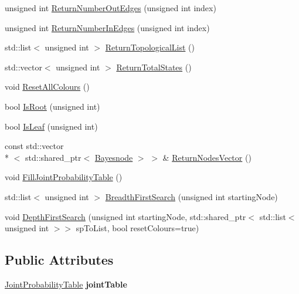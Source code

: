\begin{DoxyCompactItemize}
\item 
unsigned int \hyperlink{classbayonet_1_1_bayesnet_aae9de07f181dc75f309b7f59e302a947}{Return\-Number\-Out\-Edges} (unsigned int index)
\item 
unsigned int \hyperlink{classbayonet_1_1_bayesnet_a7d47ce38f3882b80121f6acc351fd373}{Return\-Number\-In\-Edges} (unsigned int index)
\item 
std\-::list$<$ unsigned int $>$ \hyperlink{classbayonet_1_1_bayesnet_a3e8e924c33186e72bfa7d8ace1c211e6}{Return\-Topological\-List} ()
\item 
std\-::vector$<$ unsigned int $>$ \hyperlink{classbayonet_1_1_bayesnet_af05513604bc2273f64abd7e685d1d636}{Return\-Total\-States} ()
\item 
void \hyperlink{classbayonet_1_1_bayesnet_a2a934ac59da3a02720c40515b6b599e7}{Reset\-All\-Colours} ()
\item 
bool \hyperlink{classbayonet_1_1_bayesnet_a5877478cf225ed47f43df29cc087c5d6}{Is\-Root} (unsigned int)
\item 
bool \hyperlink{classbayonet_1_1_bayesnet_af9809dc12e3f77859f9674ced08fe7b0}{Is\-Leaf} (unsigned int)
\item 
const std\-::vector\\*
$<$ std\-::shared\-\_\-ptr$<$ \hyperlink{classbayonet_1_1_bayesnode}{Bayesnode} $>$ $>$ \& \hyperlink{classbayonet_1_1_bayesnet_ab0e31b9a2b625b5b59d3e70e3c7e4101}{Return\-Nodes\-Vector} ()
\item 
void \hyperlink{classbayonet_1_1_bayesnet_a586e4951a91ac2c47d8448caea25d657}{Fill\-Joint\-Probability\-Table} ()
\item 
std\-::list$<$ unsigned int $>$ \hyperlink{classbayonet_1_1_bayesnet_adef5210316c514cd50e977d5bc6292e5}{Breadth\-First\-Search} (unsigned int starting\-Node)
\item 
void \hyperlink{classbayonet_1_1_bayesnet_a8ab753ba22b35727cce998e2266b9afe}{Depth\-First\-Search} (unsigned int starting\-Node, std\-::shared\-\_\-ptr$<$ std\-::list$<$ unsigned int $>$$>$ sp\-To\-List, bool reset\-Colours=true)
\end{DoxyCompactItemize}
\subsection*{Public Attributes}
\begin{DoxyCompactItemize}
\item 
\hypertarget{classbayonet_1_1_bayesnet_ae162418e729b5c401f36ed1ef1d1b980}{\hyperlink{classbayonet_1_1_joint_probability_table}{Joint\-Probability\-Table} {\bfseries joint\-Table}}\label{classbayonet_1_1_bayesnet_ae162418e729b5c401f36ed1ef1d1b980}

\end{DoxyCompactItemize}


